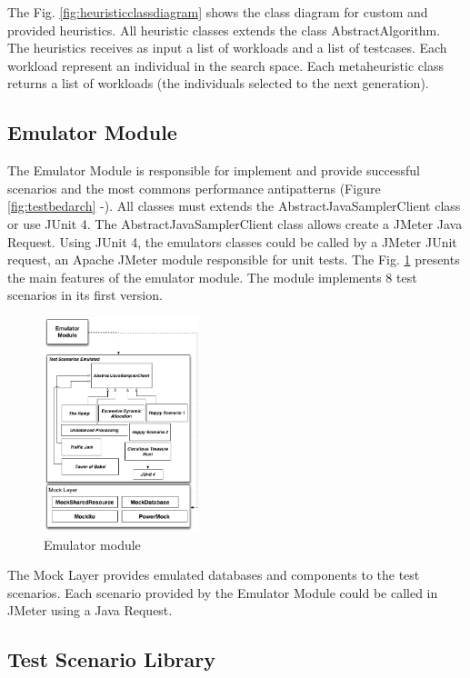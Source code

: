 The Fig. \ref{fig:heuristicclassdiagram} shows the  class diagram for custom and provided heuristics. All heuristic classes extends the class AbstractAlgorithm. The heuristics receives  as input a  list of workloads and a list of testcases. Each workload represent an individual in the search space. Each metaheuristic class returns a list of workloads (the individuals selected to the next generation). 



\subsection{Emulator Module}

The Emulator Module is responsible for implement and provide successful scenarios and the most commons performance antipatterns (Figure \ref{fig:testbedarch}  -). All classes must extends the AbstractJavaSamplerClient class or use JUnit 4. The AbstractJavaSamplerClient class allows create a JMeter Java Request.  Using JUnit 4, the emulators classes could be called by a JMeter JUnit request, an Apache JMeter module responsible for unit tests. The Fig. \ref{fig:emulator} presents the main features of the emulator module. The module implements 8 test scenarios in its first version.

\begin{figure}[h]
\centering
\includegraphics[width=0.4\textwidth]{./images/emulator.png}
\caption{Emulator module}
\label{fig:emulator}
\end{figure}  

The Mock Layer provides emulated databases and components to the test scenarios. Each scenario provided by the Emulator Module could be called in JMeter using a Java Request. 

\subsection{Test Scenario Library}

